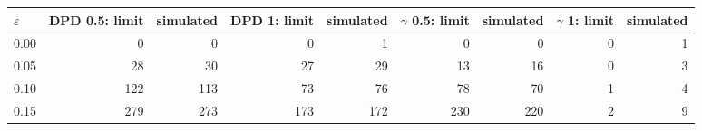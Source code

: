 \begin{tabular}{lrrrrrrrr}
\toprule
$\varepsilon$ & DPD 0.5: limit & simulated & DPD 1: limit & simulated & $\gamma$ 0.5: limit & simulated & $\gamma$ 1: limit & simulated \\
\midrule
0.00 & 0 & 0 & 0 & 1 & 0 & 0 & 0 & 1 \\
0.05 & 28 & 30 & 27 & 29 & 13 & 16 & 0 & 3 \\
0.10 & 122 & 113 & 73 & 76 & 78 & 70 & 1 & 4 \\
0.15 & 279 & 273 & 173 & 172 & 230 & 220 & 2 & 9 \\
\bottomrule
\end{tabular}
